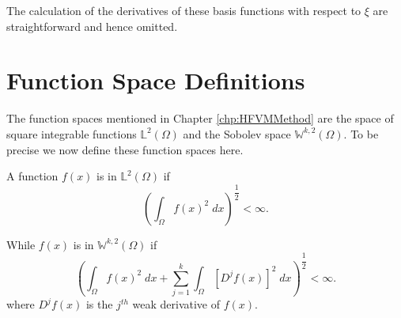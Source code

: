 The calculation of the derivatives of these basis functions with respect to $\xi$ are straightforward and hence omitted. 

\section{Function Space Definitions}
The function spaces mentioned in Chapter \ref{chp:HFVMMethod} are the space of square integrable functions $\mathbb{L}^2(\Omega)$ and the Sobolev space $\mathbb{W}^{k,2}(\Omega)$. To be precise we now define these function spaces here. 

A function $f(x)$ is in $\mathbb{L}^2(\Omega)$ if
\begin{equation*}
\left( \int_{\Omega} f(x)^2 \; dx \right)^{\dfrac{1}{2}} < \infty.
\end{equation*}

While $f(x)$ is in $\mathbb{W}^{k,2}(\Omega)$ if 
\begin{equation*}
\left( \int_{\Omega} f(x)^2 \; dx + \sum^k_{j=1}  \int_{\Omega} \left[D^j f(x) \right]^2 \; dx  \right)^{\dfrac{1}{2}} < \infty.
\end{equation*}
where $D^j f(x)$ is the $j^{th}$ weak derivative of $f(x)$. 


